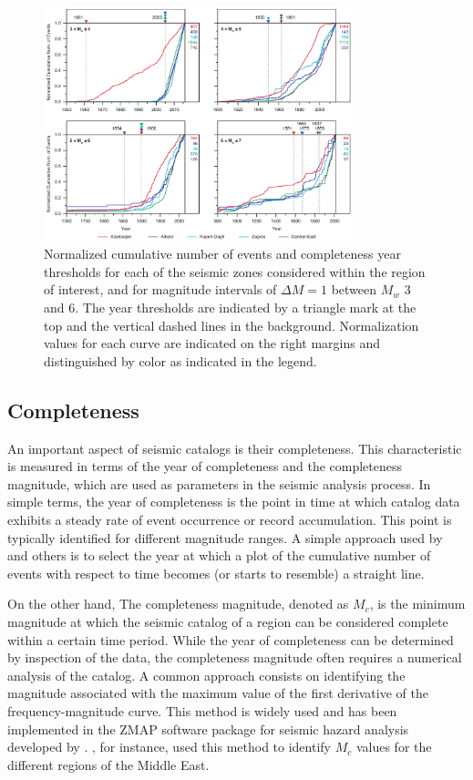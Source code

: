 \begin{figure}[t]
    \centering
    \includegraphics[width=0.8\textwidth]{figures/pdf/figure-05.pdf} 
    \caption{Normalized cumulative number of events and completeness year thresholds for each of the seismic zones considered within the region of interest, and for magnitude intervals of $\Delta M = 1$ between $M_w$ 3 and 6. The year thresholds are indicated by a triangle mark at the top and the vertical dashed lines in the background. Normalization values for each curve are indicated on the right margins and distinguished by color as indicated in the legend.}
    \label{fig:completeness}
\end{figure}

\subsection{Completeness}

An important aspect of seismic catalogs is their completeness. This characteristic is measured in terms of the year of completeness and the completeness magnitude, which are used as parameters in the seismic analysis process. In simple terms, the year of completeness is the point in time at which catalog data exhibits a steady rate of event occurrence or record accumulation. This point is typically identified for different magnitude ranges. A simple approach used by \citet{Frankel1995} and others is to select the year at which a plot of the cumulative number of events with respect to time becomes (or starts to resemble) a straight line.

On the other hand, The completeness magnitude, denoted as $M_c$, is the minimum magnitude at which the seismic catalog of a region can be considered complete within a certain time period. While the year of completeness can be determined by inspection of the data, the completeness magnitude often requires a numerical analysis of the catalog. A common approach consists on identifying the magnitude associated with the maximum value of the first derivative of the frequency-magnitude curve. This method is widely used and has been implemented in the ZMAP software package for seismic hazard analysis developed by \citet{Wiemer2001}. \citet{Zare2014}, for instance, used this method to identify $M_c$ values for the different regions of the Middle East.

